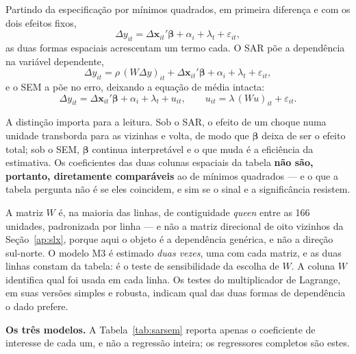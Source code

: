 Partindo da especificação por mínimos quadrados, em primeira diferença e com
os dois efeitos fixos,
\begin{equation}
\Delta y_{it} = \Delta \mathbf{x}_{it}'\boldsymbol{\beta}
             + \alpha_i + \lambda_t + \varepsilon_{it},
\label{eq:mq}
\end{equation}
\noindent as duas formas espaciais acrescentam um termo cada. O SAR põe a
dependência na variável dependente,
\begin{equation}
\Delta y_{it} = \rho\,(W\Delta y)_{it} + \Delta \mathbf{x}_{it}'\boldsymbol{\beta}
             + \alpha_i + \lambda_t + \varepsilon_{it},
\label{eq:sar}
\end{equation}
\noindent e o SEM a põe no erro, deixando a equação de média intacta:
\begin{equation}
\Delta y_{it} = \Delta \mathbf{x}_{it}'\boldsymbol{\beta} + \alpha_i + \lambda_t + u_{it},
\qquad u_{it} = \lambda\,(Wu)_{it} + \varepsilon_{it}.
\label{eq:sem}
\end{equation}

\noindent A distinção importa para a leitura. Sob o SAR, o efeito de um choque
numa unidade transborda para as vizinhas e volta, de modo que
\(\boldsymbol{\beta}\) deixa de ser o efeito total; sob o SEM, \(\boldsymbol{\beta}\)
continua interpretável e o que muda é a eficiência da estimativa. Os
coeficientes das duas colunas espaciais da tabela \textbf{não são, portanto,
diretamente comparáveis} ao de mínimos quadrados --- e o que a tabela pergunta
não é se eles coincidem, e sim se o sinal e a significância resistem.

A matriz \(W\) é, na maioria das linhas, de contiguidade \emph{queen} entre as
166 unidades, padronizada por linha --- e não a matriz direcional de oito
vizinhos da Seção~\ref{ap:slx}, porque aqui o objeto é a dependência genérica,
e não a direção sul-norte. O modelo M3 é estimado \emph{duas vezes}, uma com
cada matriz, e as duas linhas constam da tabela: é o teste de sensibilidade da
escolha de \(W\). A coluna \(W\) identifica qual foi usada em cada linha. Os
testes do multiplicador de Lagrange, em suas versões simples e robusta, indicam
qual das duas formas de dependência o dado prefere.

\textbf{Os três modelos.} A Tabela~\ref{tab:sarsem} reporta apenas o
coeficiente de interesse de cada um, e não a regressão inteira; os regressores
completos são estes.

